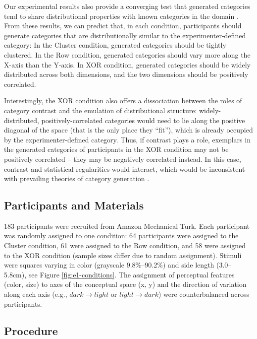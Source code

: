\documentclass[12pt]{article}
\begin{document}
\begin{flushleft}
Our experimental results also provide a converging test
that generated categories tend to share distributional properties with known
categories in the domain \citep{jern2013probabilistic,ward1994structured}. From
these results, we can predict that, in each condition, participants should
generate categories that are distributionally similar to the
experimenter-defined category: In the Cluster condition, generated categories
should be tightly clustered. In the Row condition, generated categories should
vary more along the X-axis than the Y-axis. In XOR condition, generated
categories should be widely distributed across both dimensions, and the two
dimensions should be positively correlated.

Interestingly, the XOR condition also offers a dissociation between the roles of
category contrast and the emulation of distributional structure:
widely-distributed, positively-correlated categories would need to lie along the
positive diagonal of the space (that is the only place they ``fit''), which is
already occupied by the experimenter-defined category. Thus, if contrast plays a
role, exemplars in the generated categories of participants in the XOR condition
may not be positively correlated -- they may be negatively correlated instead.
In this case, contrast and statistical regularities would interact, which would
be inconsistent with prevailing theories of category generation
\citep{jern2013probabilistic}.


\subsection{Participants and Materials}

183 participants were recruited from Amazon Mechanical Turk. Each participant
was randomly assigned to one condition: 64 participants were assigned to the
Cluster condition, 61 were assigned to the Row condition, and 58 were assigned
to the XOR condition (sample sizes differ due to random assignment). Stimuli
were squares varying in color (grayscale 9.8\%--90.2\%) and side length
(3.0--5.8cm), see Figure \ref{fig:e1-conditions}. The assignment of perceptual
features (color, size) to axes of the conceptual space (x, y)  and the
direction of variation along each axis (e.g., $dark \rightarrow light$ or $light
\rightarrow dark$) were counterbalanced across participants.

\subsection{Procedure}


\end{flushleft}
\end{document}
